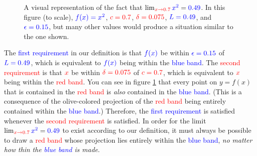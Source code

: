 \documentclass{myarticle}
\newcommand{\hor}[1]{\textcolor{red}{#1}}
\newcommand{\ver}[1]{\textcolor{blue}{#1}}
\newcommand{\olive}[1]{\textcolor{green!50!red}{#1}}
\theoremstyle{nospace}
\newtheorem{old series theorem}{Theorem}
\newenvironment{series theorem}
{\begin{mdframed}\begin{old series theorem}}
    {\end{old series theorem}\end{mdframed}}
\begin{document}
\begin{figure}[htb!] \centering
  \caption{A visual representation of the fact that
    $\lim_{\hor{x \to 0.7}} \ver{x^2} = \ver{0.49}$. In this figure
    (to scale), $\ver{f(x) = x^2}$, $\hor{c = 0.7}$,
    $\hor{\delta = 0.075}$, $\ver{L = 0.49}$, and
    $\ver{\epsilon = 0.15}$, but many other values would produce a
    situation similar to the one shown.}
  \label{fig:ed}
\end{figure}

The \ver{first requirement} in our definition is that $\ver{f(x)}$ be
within $\ver{\epsilon = 0.15}$ of $\ver{L = 0.49}$, which is
equivalent to $\ver{f(x)}$ being within the \ver{blue band}. The
\hor{second requirement} is that $\hor{x}$ be within
$\hor{\delta = 0.075}$ of $\hor{c = 0.7}$, which is equivalent to
$\hor{x}$ being within the \hor{red band}. You can see in figure
\ref{fig:ed} that every point on $y = f(x)$ that is contained in the
\hor{red band} is \emph{also} contained in the \ver{blue band}. (This
is a consequence of the \olive{olive-colored projection} of the
\hor{red band} being entirely contained within the \ver{blue band}.)
Therefore, the \ver{first requirement} is satisfied whenever the
\hor{second requirement} is satisfied. In order for the limit
$\lim_{\hor{x \to 0.7}} \ver{x^2} = \ver{0.49}$ to exist according to
our definition, it must always be possible to draw a \hor{red band}
whose \olive{projection} lies entirely within the \ver{blue band},
\emph{no matter how thin the \ver{blue band} is made}.
\end{document}
